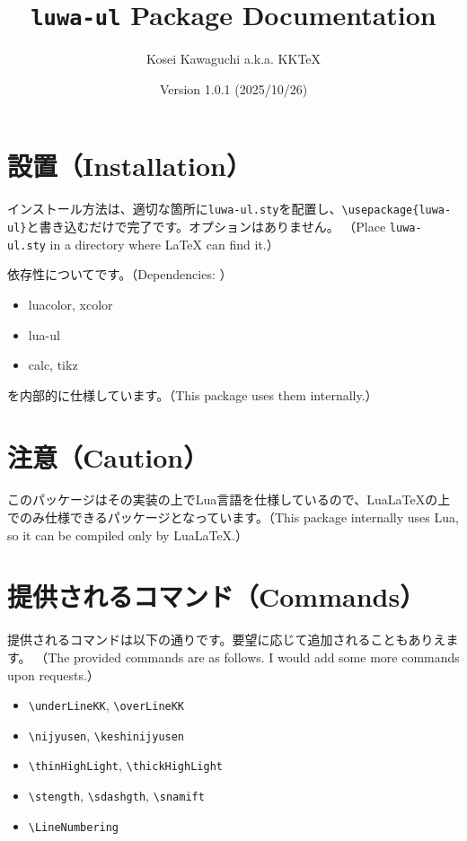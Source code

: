 \documentclass[luatex,fontsize=8pt,paper=b5,twoside]{jlreq}%
\title{\texttt{luwa-ul} Package Documentation}
\author{Kosei Kawaguchi a.k.a. KKTeX}
\date{Version 1.0.1 (2025/10/26)}
\begin{document}
\begin{titlepage}
  \maketitle
\end{titlepage}
\newpage
\tableofcontents
\newpage

\section{設置（Installation）}
インストール方法は、適切な箇所に\texttt{luwa-ul.sty}を配置し、\verb|\usepackage{luwa-ul}|と書き込むだけで完了です。オプションはありません。
（Place \texttt{luwa-ul.sty} in a directory where LaTeX can find it.）

依存性についてです。（Dependencies: ）

\begin{itemize}
  \item luacolor, xcolor
  \item lua-ul
  \item calc, tikz
\end{itemize}

\noindent を内部的に仕様しています。（This package uses them internally.）

\section{注意（Caution）}
このパッケージはその実装の上でLua言語を仕様しているので、LuaLaTeXの上でのみ仕様できるパッケージとなっています。（This package internally uses Lua, so it can be compiled only by LuaLaTeX.）

\section{提供されるコマンド（Commands）}
提供されるコマンドは以下の通りです。要望に応じて追加されることもありえます。
（The provided commands are as follows. I would add some more commands upon requests.）

\begin{itemize}
  \item \verb|\underLineKK|, \verb|\overLineKK|
  \item \verb|\nijyusen|, \verb|\keshinijyusen|
  \item \verb|\thinHighLight|, \verb|\thickHighLight|
  \item \verb|\stength|, \verb|\sdashgth|, \verb|\snamift|
  \item \verb|\LineNumbering|
\end{itemize}
\end{document}
